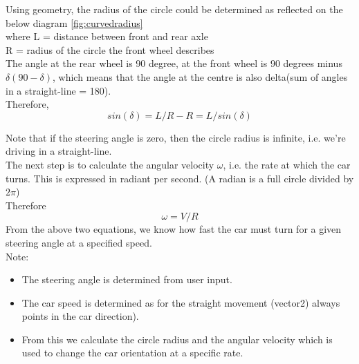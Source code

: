 \documentclass{book}
\begin{document}
Using geometry, the radius of the circle could be determined as reflected on the below diagram \ref{fig:curvedradius}\\
where L = distance between front and rear axle\\
    R = radius of the circle the front wheel describes\\
    The angle at the rear wheel is 90 degree, at the front wheel is 90 degrees minus $\delta (90-\delta)$, which means that the angle at the centre is also delta(sum of angles in a straight-line = 180).\\
  Therefore,
  \begin{equation}
    sin (\delta) = L/R - R = L/sin(\delta)
  \end{equation}

Note that if the steering angle is zero, then the circle radius is infinite, i.e. we're driving in a straight-line. \\

The next step is to calculate the angular velocity  $\omega$, i.e. the rate at which the car turns. This is expressed in radiant per second. (A radian is a full circle divided by $ 2 \pi$)\\
 Therefore
\begin{equation}
  \omega = V/R
  \end{equation}
From the above two equations, we know how fast the car must turn for a given steering angle at a specified speed.\\
Note:\\
\begin{itemize}
\item The steering angle is determined from user input.
\item The car speed is determined as for the straight movement (vector2) always points in the car direction).
\item From this we calculate the circle radius and the angular velocity which is used to change the car orientation at a specific rate.
\end{itemize}
\end{document}
